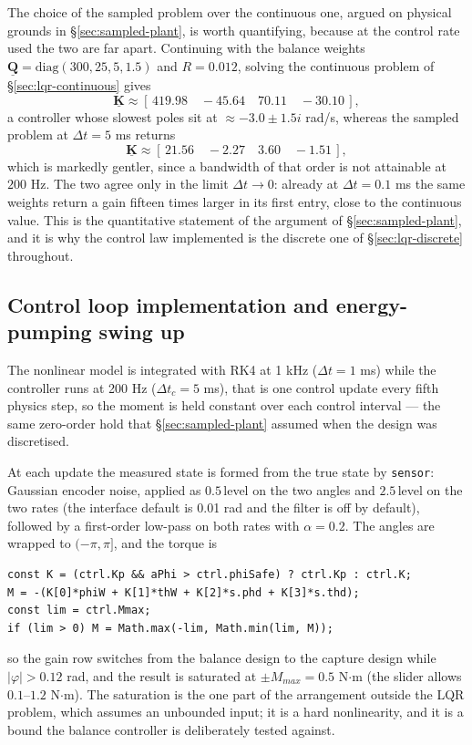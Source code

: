 \documentclass[12pt]{article}
\newcommand{\mb}[1]{\underline{\mathbf{#1}}}
\begin{document}
The choice of the sampled problem over the continuous one, argued on physical grounds in \S\ref{sec:sampled-plant}, is worth quantifying, because at the control rate used the two are far apart. Continuing with the balance weights $\mb{Q} = \text{diag}(300, 25, 5, 1.5)$ and $R = 0.012$, solving the continuous problem of \S\ref{sec:lqr-continuous} gives
\[
\mb{K} \approx [\,419.98 \quad -45.64 \quad 70.11 \quad -30.10\,],
\]
a controller whose slowest poles sit at $\approx -3.0 \pm 1.5i$ rad/s, whereas the sampled problem at $\Delta t = 5$ ms returns
\[
\mb{K} \approx [\,21.56 \quad -2.27 \quad 3.60 \quad -1.51\,],
\]
which is markedly gentler, since a bandwidth of that order is not attainable at $200$ Hz. The two agree only in the limit $\Delta t \to 0$: already at $\Delta t = 0.1$ ms the same weights return a gain fifteen times larger in its first entry, close to the continuous value. This is the quantitative statement of the argument of \S\ref{sec:sampled-plant}, and it is why the control law implemented is the discrete one of \S\ref{sec:lqr-discrete} throughout.

\subsection{Control loop implementation and energy-pumping swing up}
\label{sec:control-loop}

The nonlinear model is integrated with RK4 at 1 kHz ($\Delta t = 1$ ms) while the controller runs at 200 Hz ($\Delta t_c = 5$ ms), that is one control update every fifth physics step, so the moment is held constant over each control interval --- the same zero-order hold that \S\ref{sec:sampled-plant} assumed when the design was discretised.

At each update the measured state is formed from the true state by \texttt{sensor}: Gaussian encoder noise, applied as $0.5\,$level on the two angles and $2.5\,$level on the two rates (the interface default is 0.01 rad and the filter is off by default), followed by a first-order low-pass on both rates with $\alpha = 0.2$. The angles are wrapped to $(-\pi, \pi]$, and the torque is
{\small
\begin{verbatim}
const K = (ctrl.Kp && aPhi > ctrl.phiSafe) ? ctrl.Kp : ctrl.K;
M = -(K[0]*phiW + K[1]*thW + K[2]*s.phd + K[3]*s.thd);
const lim = ctrl.Mmax;
if (lim > 0) M = Math.max(-lim, Math.min(lim, M));
\end{verbatim}
}
\noindent so the gain row switches from the balance design to the capture design while $|\varphi| > 0.12$ rad, and the result is saturated at $\pm M_{max} = 0.5$ N$\cdot$m (the slider allows $0.1$--$1.2$ N$\cdot$m). The saturation is the one part of the arrangement outside the LQR problem, which assumes an unbounded input; it is a hard nonlinearity, and it is a bound the balance controller is deliberately tested against.
\end{document}
